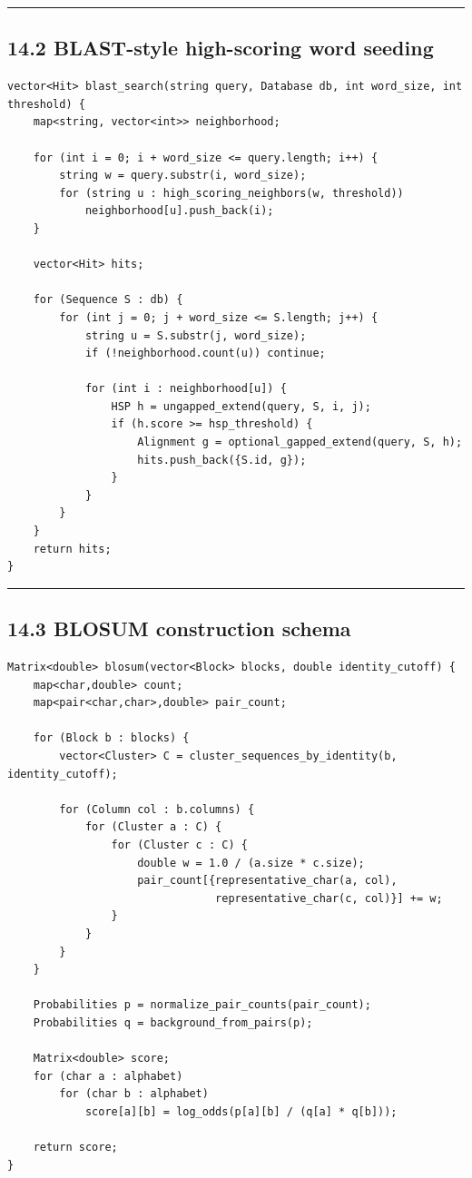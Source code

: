 \documentclass[11pt]{article}
\begin{document}
\begin{center}\rule{0.5\linewidth}{0.5pt}\end{center}

\subsection{14.2 BLAST-style high-scoring word seeding}\label{blast-style-high-scoring-word-seeding}

\begin{verbatim}
vector<Hit> blast_search(string query, Database db, int word_size, int threshold) {
    map<string, vector<int>> neighborhood;

    for (int i = 0; i + word_size <= query.length; i++) {
        string w = query.substr(i, word_size);
        for (string u : high_scoring_neighbors(w, threshold))
            neighborhood[u].push_back(i);
    }

    vector<Hit> hits;

    for (Sequence S : db) {
        for (int j = 0; j + word_size <= S.length; j++) {
            string u = S.substr(j, word_size);
            if (!neighborhood.count(u)) continue;

            for (int i : neighborhood[u]) {
                HSP h = ungapped_extend(query, S, i, j);
                if (h.score >= hsp_threshold) {
                    Alignment g = optional_gapped_extend(query, S, h);
                    hits.push_back({S.id, g});
                }
            }
        }
    }
    return hits;
}
\end{verbatim}

\begin{center}\rule{0.5\linewidth}{0.5pt}\end{center}

\subsection{14.3 BLOSUM construction schema}\label{blosum-construction-schema}

\begin{verbatim}
Matrix<double> blosum(vector<Block> blocks, double identity_cutoff) {
    map<char,double> count;
    map<pair<char,char>,double> pair_count;

    for (Block b : blocks) {
        vector<Cluster> C = cluster_sequences_by_identity(b, identity_cutoff);

        for (Column col : b.columns) {
            for (Cluster a : C) {
                for (Cluster c : C) {
                    double w = 1.0 / (a.size * c.size);
                    pair_count[{representative_char(a, col),
                                representative_char(c, col)}] += w;
                }
            }
        }
    }

    Probabilities p = normalize_pair_counts(pair_count);
    Probabilities q = background_from_pairs(p);

    Matrix<double> score;
    for (char a : alphabet)
        for (char b : alphabet)
            score[a][b] = log_odds(p[a][b] / (q[a] * q[b]));

    return score;
}
\end{verbatim}
\end{document}
